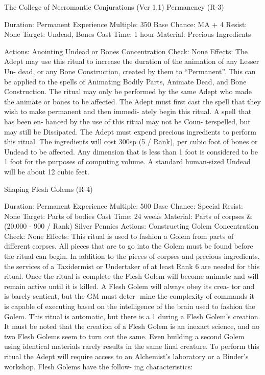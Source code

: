 \begin{Chapter}{The College of Necromantic Conjurations (Ver 1.1)}
Permanency (R-3) 

Duration: Permanent 
Experience Multiple: 350 
Base Chance: MA + 4%
Resist: None 
Target: Undead, Bones 
Cast Time: 1 hour 
Material: Precious Ingredients 

Actions: Anointing Undead or Bones 
Concentration Check: None 
Effects:  The  Adept  may  use  this  ritual  to  increase 
the  duration  of  the  animation  of  any  Lesser  Un-
dead, or any Bone Construction, created by them to 
“Permanent”.  This  can  be  applied  to  the  spells  of 
Animating  Bodily  Parts,  Animate  Dead,  and Bone 
Construction. The ritual may only be performed by 
the same Adept who made the animate or bones to 
be affected. The Adept must first cast the spell that 
they  wish  to  make  permanent  and  then  immedi-
ately  begin  this  ritual.  A  spell  that  has  been  en-
hanced by  the  use  of  this  ritual  may  not  be  Coun-
terspelled,  but  may  still  be  Dissipated.  The  Adept 
must  expend  precious  ingredients  to  perform  this 
ritual.  The  ingredients  will  cost  300sp  (5  /  Rank), 
per  cubic  foot  of  bones  or  Undead  to  be  affected. 
Any dimension that is less than 1 foot is considered 
to be 1 foot for the purposes of computing volume. 
A  standard  human-sized  Undead  will  be  about  12 
cubic feet. 

Shaping Flesh Golems (R-4) 

Duration: Permanent 
Experience Multiple: 500 
Base Chance: Special 
Resist: None 
Target: Parts of bodies 
Cast Time: 24 weeks 
Material: Parts of corpses \& (20,000 - 900 / Rank) 
Silver Pennies 
Actions: Constructing Golem 
Concentration Check: None 
Effects: This ritual is used to fashion a Golem from 
parts of different corpses. All pieces that are to go 
into the Golem must be found before the ritual can 
begin.  In  addition  to  the  pieces  of  corpses  and 
precious  ingredients,  the  services  of  a  Taxidermist 
or Undertaker of at least Rank 6 are needed for this 
ritual. Once the ritual is complete the Flesh Golem 
will become animate and will remain active until it 
is killed. A Flesh Golem will always obey its crea-
tor  and  is  barely  sentient,  but  the  GM  must  deter-
mine the complexity of commands it is capable of 
executing  based  on  the  intelligence  of  the  brain 
used to fashion the Golem. This ritual is automatic, 
but there is a 1%
during  a  Flesh  Golem’s  creation.  It  must be  noted 
that  the  creation  of  a  Flesh  Golem  is  an  inexact 
science, and no two Flesh Golems seem to turn out 
the  same.  Even  building  a  second  Golem  using 
identical  materials  rarely  results  in  the  same  final 
creature.  To  perform  this  ritual  the  Adept  will 
require  access  to  an  Alchemist’s  laboratory  or  a 
Binder’s workshop. Flesh Golems have the follow-
ing characteristics: 


\end{Chapter}
